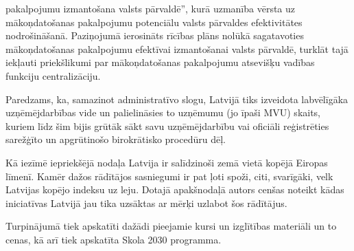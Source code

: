 pakalpojumu izmantošana valsts pārvaldē”, kurā uzmanība vērsta uz mākoņdatošanas
pakalpojumu potenciālu valsts pārvaldes efektivitātes nodrošināšanā. Paziņojumā ierosināts
rīcības plāns nolūkā sagatavoties mākoņdatošanas pakalpojumu efektīvai izmantošanai
valsts pārvaldē, turklāt tajā iekļauti priekšlikumi par mākoņdatošanas pakalpojumu atsevišķu
vadības funkciju centralizāciju.
\par
Paredzams, ka, samazinot administratīvo slogu, Latvijā tiks izveidota labvēlīgāka
uzņēmējdarbības vide un palielināsies to uzņēmumu (jo īpaši MVU) skaits, kuriem līdz šim
bijis grūtāk sākt savu uzņēmējdarbību vai oficiāli reģistrēties sarežģīto un apgrūtinošo
birokrātisko procedūru dēļ.
\par
Kā iezīmē iepriekšējā nodaļa Latvija ir salīdzinoši zemā vietā kopējā Eiropas līmenī.
Kamēr dažos rādītājos sasniegumi ir pat ļoti spoži, citi, svarīgāki, velk Latvijas kopējo
indeksu uz leju. Dotajā apakšnodaļā autors cenšas noteikt kādas iniciatīvas Latvijā jau
tika uzsāktas ar mērķi uzlabot šos rādītājus.
\par
Turpinājumā tiek apskatīti dažādi pieejamie kursi un izglītības materiāli un to cenas,
kā arī tiek apskatīta Skola 2030 programma.